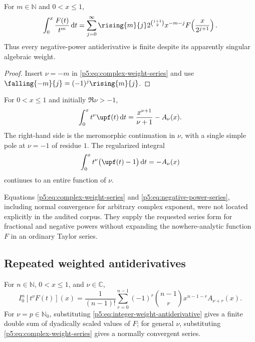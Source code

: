 \documentclass[11pt,oneside]{article}
\theoremstyle{definition}
\theoremstyle{remark}
\newcommand{\C}{\mathbb C}
\newcommand{\N}{\mathbb N}
\newcommand{\dd}{\,\mathrm d}
\newcommand{\1}{\mathbf 1}
\begin{document}
\begin{corollary}\label{p5:cor:negative-powers}
For $m\in\N$ and $0<x\le1$,
\begin{equation}\label{p5:eq:negative-power-series}
 \int_0^x\frac{F(t)}{t^m}\dd t
 =\sum_{j=0}^{\infty}\rising{m}{j}
 2^{\binom{j+1}{2}}x^{-m-j}
 F\!\left(\frac{x}{2^{j+1}}\right).
\end{equation}
Thus every negative-power antiderivative is finite despite its apparently singular algebraic weight.
\end{corollary}

\begin{proof}
Insert $\nu=-m$ in \eqref{p5:eq:complex-weight-series} and use
$\falling{-m}{j}=(-1)^j\rising{m}{j}$.
\end{proof}

\begin{corollary}\label{p5:cor:up-complex-weight}
For $0<x\le1$ and initially $\Re\nu>-1$,
\begin{equation}\label{p5:eq:up-complex-weight}
 \int_0^x t^\nu\upf(t)\dd t
 =\frac{x^{\nu+1}}{\nu+1}-A_\nu(x).
\end{equation}
The right-hand side is the meromorphic continuation in $\nu$, with a single simple pole at $\nu=-1$ of residue $1$.  The regularized integral
\begin{equation}
 \int_0^x t^\nu\bigl(\upf(t)-1\bigr)\dd t=-A_\nu(x)
\end{equation}
continues to an entire function of $\nu$.
\end{corollary}

\newresultPartii Equations \eqref{p5:eq:complex-weight-series} and \eqref{p5:eq:negative-power-series}, including normal convergence for arbitrary complex exponent, were not located explicitly in the audited corpus.  They supply the requested series form for fractional and negative powers without expanding the nowhere-analytic function $F$ in an ordinary Taylor series.

\subsection{Repeated weighted antiderivatives}

\begin{corollary}\label{p5:cor:weighted-nth-primitive}
For $n\in\N$, $0<x\le1$, and $\nu\in\C$,
\begin{equation}\label{p5:eq:weighted-nth-primitive}
 I_0^n[t^\nu F(t)](x)
 =\frac1{(n-1)!}\sum_{r=0}^{n-1}(-1)^r
 \binom{n-1}{r}x^{n-1-r}A_{\nu+r}(x).
\end{equation}
For $\nu=p\in\N_0$, substituting \eqref{p5:eq:integer-weight-antiderivative} gives a finite double sum of dyadically scaled values of $F$; for general $\nu$, substituting \eqref{p5:eq:complex-weight-series} gives a normally convergent series.
\end{corollary}
\end{document}
